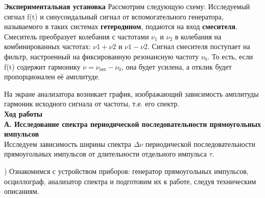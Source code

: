 \documentclass[a4paper,12pt]{article}
\begin{document}
\noindent \textbf{Экспериментальная установка}
	Рассмотрим следующую схему: 	
Исследуемый сигнал f(t) и синусоидальный сигнал от вспомогательного генератора, называемого в таких системах \textbf{гетеродином}, подаются на вход \textbf{смесителя}. Смеситель преобразует колебания с частотами $\nu_1$ и $\nu_2$ в колебания на комбинированных частотах: $\nu1 + \nu2$ и $\nu1 - \nu2$. Сигнал смесителя поступает на фильтр, настроенный на фиксированную резонансную частоту $\nu_0$. То есть, если f(t) содержит гармонику $\nu = \nu_{гет} - \nu_0$, она будет усилена, а отклик будет пропорционален её амплитуде.


На экране анализатора возникает график, изображающий зависимость амплитуды гармоник исходного сигнала от частоты, т.е. его спектр.\\

\textbf{Ход работы}\\

\textbf{А. Исследование спектра периодической последовательности прямоугольных импульсов}\\

Исследуем зависимость ширины спектра $\Delta\nu$ периодической последовательности прямоугольных импульсов от длительности отдельного импульса $\tau$. 

) Ознакомимся с устройством приборов: генератор прямоугольных импульсов, осциллограф, анализатор спектра и подготовим их к работе, следуя техническим описаниям. 

\end{document}
